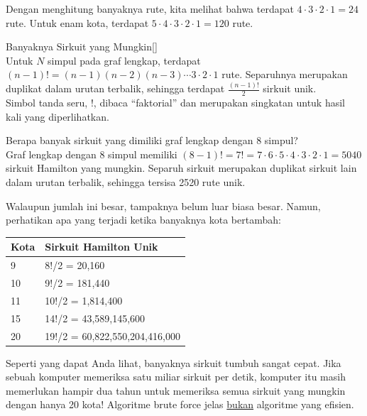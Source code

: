 \noindent Dengan menghitung banyaknya rute, kita melihat bahwa terdapat $4\cdot 3\cdot 2 \cdot 1 = 24$ rute.  Untuk enam kota, terdapat $5\cdot 4\cdot 3\cdot 2 \cdot 1 =120$ rute.  

\begin{theorem}{Banyaknya Sirkuit yang Mungkin}[]
\hspace{1in}\\
Untuk $N$ simpul pada graf lengkap, terdapat $(n-1)!=(n-1)(n-2)(n-3)\cdots 3\cdot 2\cdot 1$ rute.  Separuhnya merupakan duplikat dalam urutan terbalik, sehingga terdapat $\frac{(n-1)!}{2}$ sirkuit unik.\\

\noindent Simbol tanda seru, $!$, dibaca “faktorial” dan merupakan singkatan untuk hasil kali yang diperlihatkan.
\end{theorem}

\begin{example}{} %
Berapa banyak sirkuit yang dimiliki graf lengkap dengan 8 simpul?\\

Graf lengkap dengan 8 simpul memiliki $(8-1)!=7!=7\cdot 6 \cdot 5\cdot 4\cdot 3\cdot 2\cdot 1 = 5040$ sirkuit Hamilton yang mungkin.  Separuh sirkuit merupakan duplikat sirkuit lain dalam urutan terbalik, sehingga tersisa 2520 rute unik.  
\end{example}

Walaupun jumlah ini besar, tampaknya belum luar biasa besar.  Namun, perhatikan apa yang terjadi ketika banyaknya kota bertambah:
\begin{center}
\begin{tabular}{|l|l|}
\hline
Kota &Sirkuit Hamilton Unik\\
\hline
9&8!/2 = 20,160\\
\hline
10&9!/2 = 181,440\\
\hline
11&10!/2 = 1,814,400\\
\hline
15 &14!/2 = 43,589,145,600\\
\hline
20&19!/2 = 60,822,550,204,416,000\\
\hline
\end{tabular}
\par{}\label{tab:graphtheory-dor1-tab06}%

\end{center}

Seperti yang dapat Anda lihat, banyaknya sirkuit tumbuh sangat cepat.  Jika sebuah komputer memeriksa satu miliar sirkuit per detik, komputer itu masih memerlukan hampir dua tahun untuk memeriksa semua sirkuit yang mungkin dengan hanya 20 kota!  Algoritme brute force jelas \underline{bukan} algoritme yang efisien.  

